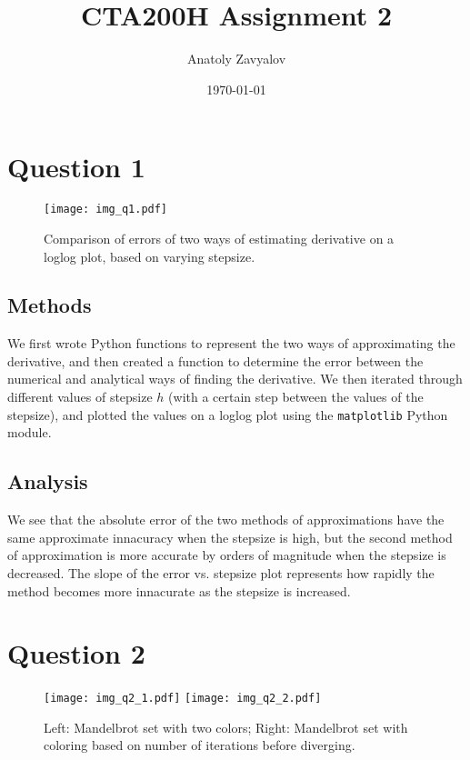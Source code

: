\documentclass[12pt]{article}
\newcommand{\code}[1]{\colorbox{backcolour}{\texttt{#1}}}
\begin{document}
\title{CTA200H Assignment 2}
\author{Anatoly Zavyalov}
\date{\today}
\maketitle

\section*{Question 1}

\begin{figure}[H]
    \begin{center}
        \texttt{[image: img\_q1.pdf]}
    \end{center}
    \caption{Comparison of errors of two ways of estimating derivative on a loglog plot, based on varying stepsize.}
\end{figure}


\subsection*{Methods}

We first wrote Python functions to represent the two ways of approximating the derivative, and then created a function to determine the error between the numerical and analytical ways of finding the derivative. We then iterated through different values of stepsize \(h\) (with a certain step between the values of the stepsize), and plotted the values on a loglog plot using the \code{matplotlib} Python module.

\subsection*{Analysis}

We see that the absolute error of the two methods of approximations have the same approximate innacuracy when the stepsize is high, but the second method of approximation is more accurate by orders of magnitude when the stepsize is decreased. The slope of the error vs. stepsize plot represents how rapidly the method becomes more innacurate as the stepsize is increased.

\newpage

\section*{Question 2}

\begin{figure}[H]
    \begin{center}
        \texttt{[image: img\_q2\_1.pdf]} 
        \texttt{[image: img\_q2\_2.pdf]}
        \caption{Left: Mandelbrot set with two colors; Right: Mandelbrot set with coloring based on number of iterations before diverging.}
    \end{center}
\end{figure}
\end{document}
